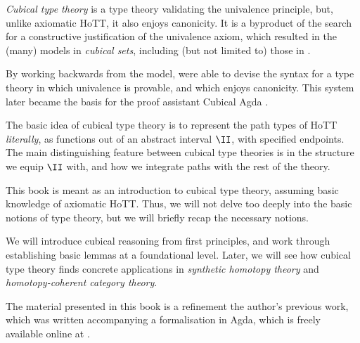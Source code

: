 \begin{node}
%
\emph{Cubical type theory} is a type theory validating the univalence
principle, but, unlike axiomatic HoTT, it also enjoys canonicity. It is
a byproduct of the search for a constructive justification of the
univalence axiom, which resulted in the (many) models in \emph{cubical
sets}, including (but not limited to) those in
\cite{Bezem:2014,CCHM:2016,AFH:2017,Orton:2017,ABCFHL:2021}.
%
\end{node}

\begin{node}
%
By working backwards from the model, \cite{CCHM:2016} were able to
devise the syntax for a type theory in which univalence is provable, and
which enjoys canonicity. This system later became the basis for the
proof assistant Cubical Agda \cite{Vezzosi:2019}.
%
\end{node}

\begin{node}
%
The basic idea of cubical type theory is to represent the path types of
HoTT \emph{literally}, as functions out of an abstract interval \(\II\),
with specified endpoints. The main distinguishing feature between
cubical type theories is in the structure we equip \(\II\) with, and how
we integrate paths with the rest of the theory.
%
\end{node}

\begin{node}
%
This book is meant as an introduction to cubical type theory, assuming
basic knowledge of axiomatic HoTT. Thus, we will not delve too deeply
into the basic notions of type theory, but we will briefly recap the
necessary notions.

We will introduce cubical reasoning from first principles, and work
through establishing basic lemmas at a foundational level. Later, we
will see how cubical type theory finds concrete applications in
\emph{synthetic homotopy theory} and \emph{homotopy-coherent category
theory}.
%
\end{node}

\begin{node}
%
The material presented in this book is a refinement the author's
previous work, which was written accompanying a formalisation in Agda,
which is freely available online at \cite{1Lab:2022}.
%
\end{node}
